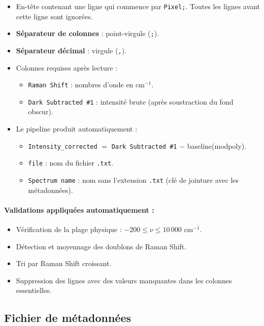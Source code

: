 \documentclass[12pt, a4paper]{article}
\begin{document}
\begin{itemize}
  \item En-tête contenant une ligne qui commence par \texttt{Pixel;}.
        Toutes les lignes avant cette ligne sont ignorées.
  \item \textbf{Séparateur de colonnes} : point-virgule (\texttt{;}).
  \item \textbf{Séparateur décimal} : virgule (\texttt{,}).
  \item Colonnes requises après lecture :
    \begin{itemize}
      \item \texttt{Raman Shift} : nombres d'onde en cm$^{-1}$.
      \item \texttt{Dark Subtracted \#1} : intensité brute (après soustraction
            du fond obscur).
    \end{itemize}
  \item Le pipeline produit automatiquement :
    \begin{itemize}
      \item \texttt{Intensity\_corrected} $=$ \texttt{Dark Subtracted \#1}
            $-$ baseline(modpoly).
      \item \texttt{file} : nom du fichier \texttt{.txt}.
      \item \texttt{Spectrum name} : nom sans l'extension \texttt{.txt}
            (clé de jointure avec les métadonnées).
    \end{itemize}
\end{itemize}

\paragraph{Validations appliquées automatiquement :}
\begin{itemize}
  \item Vérification de la plage physique : $-200 \leq \nu \leq 10\,000$
        cm$^{-1}$.
  \item Détection et moyennage des doublons de Raman Shift.
  \item Tri par Raman Shift croissant.
  \item Suppression des lignes avec des valeurs manquantes dans les colonnes
        essentielles.
\end{itemize}

\subsection{Fichier de métadonnées}
\end{document}
